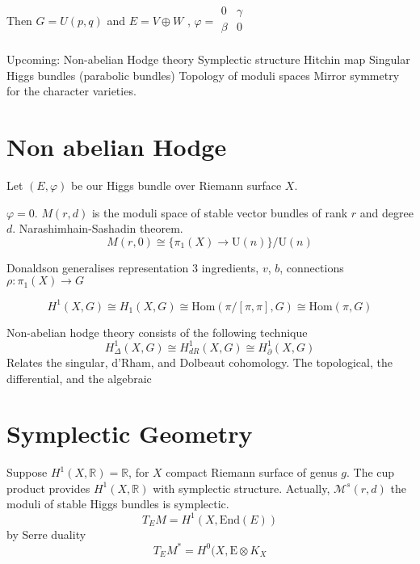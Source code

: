 Then $ G = U(p,q) $ and $ E = V \oplus W $ , $\varphi = \begin{array}{rr}
    0 &  \gamma \\
    \beta & 0 \\
\end{array} $ 

Upcoming:
Non-abelian Hodge theory
Symplectic structure 
Hitchin map 
Singular Higgs bundles (parabolic bundles) 
Topology of moduli spaces 
Mirror symmetry for the character varieties. 

\section{Non abelian Hodge} %

Let $(E, \varphi) $ be our Higgs bundle over Riemann surface $X$.


$\varphi = 0 $. 
$M(r,d) $ is the moduli space of stable vector bundles of rank $r$ and degree $d$.
Narashimhain-Sashadin theorem. 
\begin{equation}
    M ( r, 0  ) \cong \{ \pi_ 1 (X) \rightarrow \mathrm{U}(n)\} / \mathrm{U}(n) 
\end{equation}

Donaldson generalises representation 
3 ingredients, $v$, $b$, connections $ \rho : \pi_1 ( X) \rightarrow  G$ 

\begin{equation}
     H^1 ( X, G) \cong H_1 ( X, G) \cong \mathrm{Hom} ( \pi / [\pi, \pi] , G) \cong \mathrm{Hom} ( \pi, G) 
\end{equation}

Non-abelian hodge theory consists of the following technique
\begin{equation}
    H^1 _{\Delta } (X, G) \cong H^1 _{dR} ( X,G) \cong H^1 _{\partial} ( X,G)  
\end{equation}
Relates the singular, d'Rham, and Dolbeaut cohomology. 
The topological, the differential, and the algebraic

\section{Symplectic Geometry} %

Suppose $ H^1( X, \mathbb{R} ) = \mathbb{R} $, 
for $ X $ compact Riemann surface of genus $g$. 
The cup product provides $H^1( X, \mathbb{R} ) $ with symplectic structure. 
Actually, 
$ \mathcal{M} ^s (r,d) $ the moduli of stable Higgs bundles is symplectic. 
\begin{equation}
    T_E M = H^1( X, \mathrm{End}(E) ) 
\end{equation}
by Serre duality
\begin{equation}
    T_E M ^* = H^0 ( X, \mathrm{E} \otimes K_X 
\end{equation}

